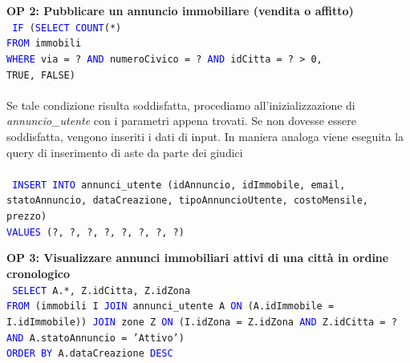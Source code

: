 \documentclass[a4paper,12pt]{report}
\begin{document}
            \noindent
            \textbf{OP 2: Pubblicare un annuncio immobiliare (vendita o affitto)} \\
            \texttt{
                \textcolor{blue}{IF} (\textcolor{blue}{SELECT} \textcolor{blue}{COUNT}(*) \\
                \null\quad\quad\textcolor{blue}{FROM} immobili \\
                \null\quad\quad\textcolor{blue}{WHERE} via = ? \textcolor{blue}{AND} numeroCivico = ? \textcolor{blue}{AND} idCitta = ? > 0, \\
                \null\quad\quad TRUE, FALSE)  \\
            } \\
            Se tale condizione risulta soddisfatta, procediamo all'inizializzazione di \textit{annuncio\_utente} con i
            parametri appena trovati. Se non dovesse essere soddisfatta, vengono inseriti i dati di input. 
            In maniera analoga viene eseguita la query di inserimento di aste da parte dei giudici \\ \\
            \texttt{
                \textcolor{blue}{INSERT INTO} annunci\_utente (idAnnuncio, idImmobile, email, statoAnnuncio, dataCreazione, tipoAnnuncioUtente, costoMensile, prezzo) \\
                \textcolor{blue}{VALUES} (?, ?, ?, ?, ?, ?, ?, ?) \\
            }

            \noindent
            \textbf{OP 3: Visualizzare annunci immobiliari attivi di una città in ordine cronologico} \\
            \texttt{
                \textcolor{blue}{SELECT} A.*, Z.idCitta, Z.idZona \\
                \textcolor{blue}{FROM} (immobili I \textcolor{blue}{JOIN} annunci\_utente A \textcolor{blue}{ON} (A.idImmobile = I.idImmobile)) \textcolor{blue}{JOIN} zone Z \textcolor{blue}{ON} (I.idZona = Z.idZona \textcolor{blue}{AND} Z.idCitta = ? \textcolor{blue}{AND} A.statoAnnuncio = 'Attivo') \\
                \textcolor{blue}{ORDER BY} A.dataCreazione  \textcolor{blue}{DESC} \\
            }
\end{document}
